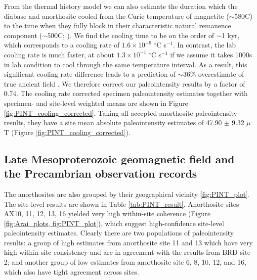 \documentclass[draft]{agujournal2019}
\begin{document}
From the thermal history model we can also estimate the duration which the diabase and anorthosite cooled from the Curie temperature of magnetite ($\sim$580\textdegree C) to the time when they fully block in their characteristic natural remanence component ($\sim$500\textdegree C; ). We find the cooling time to be on the order of $\sim$1 kyr, which corresponds to a cooling rate of $1.6\times10^{-9}$ $^\circ$C s$^{-1}$. In contrast, the lab cooling rate is much faster, at about $1.3\times10^{-1}$ $^\circ$C s$^{-1}$ if we assume it takes 1000s in lab condition to cool through the same temperature interval. As a result, this significant cooling rate difference leads to a prediction of $\sim$36\% overestimate of true ancient field \cite{Halgedahl1980a}. We therefore correct our paleointensity results by a factor of 0.74. The cooling rate corrected specimen paleointensity estimates together with specimen- and site-level weighted means are shown in Figure \ref{fig:PINT_cooling_corrected}. Taking all accepted anorthosite paleointensity results, they have a site mean absolute paleointensity estimates of 47.90 $\pm$ 9.32 $\mu$T (Figure \ref{fig:PINT_cooling_corrected}). 

\subsection*{Late Mesoproterozoic geomagnetic field and the Precambrian observation records}
The anorthosites are also grouped by their geographical vicinity \ref{fig:PINT_plot}. The site-level results are shown in Table \ref{tab:PINT_result}. Anorthosite sites AX10, 11, 12, 13, 16 yielded very high within-site coherence (Figure \ref{fig:Arai_plots, fig:PINT_plot}), which suggest high-confidence site-level paleointensity estimates. Clearly there are two populations of paleointensity results: a group of high estimates from anorthosite site 11 and 13 which have very high within-site consistency and are in agreement with the results from BRD site 2; and another group of low estimates from anorthosite site 6, 8, 10, 12, and 16, which also have tight agreement across sites.
\end{document}
